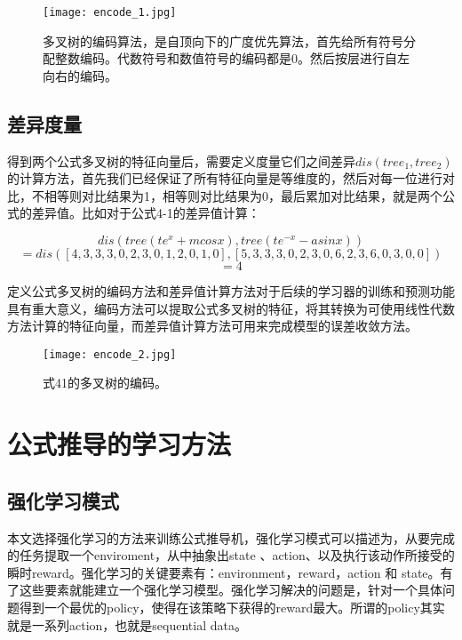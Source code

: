 \documentclass[runningheads]{llncs}
\begin{document}
\begin{figure}[H]
\centering
\texttt{[image: encode\_1.jpg]}
\caption{多叉树的编码算法，是自顶向下的广度优先算法，首先给所有符号分配整数编码。代数符号和数值符号的编码都是0。然后按层进行自左向右的编码。}
\end{figure}


\subsection{差异度量}
得到两个公式多叉树的特征向量后，需要定义度量它们之间差异$dis(tree_1,tree_2)$的计算方法，首先我们已经保证了所有特征向量是等维度的，然后对每一位进行对比，不相等则对比结果为1，相等则对比结果为0，最后累加对比结果，就是两个公式的差异值。比如对于公式4-1的差异值计算：

$$dis(tree(te^x+mcosx),tree(te^{-x}-asinx))$$
$$=dis([4,3,3,3,0,2,3,0,1,2,0,1,0],[5,3,3,3,0,2,3,0,6,2,3,6,0,3,0,0])$$
$$=4$$


定义公式多叉树的编码方法和差异值计算方法对于后续的学习器的训练和预测功能具有重大意义，编码方法可以提取公式多叉树的特征，将其转换为可使用线性代数方法计算的特征向量，而差异值计算方法可用来完成模型的误差收敛方法。

\begin{figure}[H]
\centering
\texttt{[image: encode\_2.jpg]}
\caption{式41的多叉树的编码。}
\end{figure}













\section{公式推导的学习方法}
\subsection{强化学习模式}
本文选择强化学习的方法来训练公式推导机，强化学习模式可以描述为，从要完成的任务提取一个enviroment，从中抽象出state 、action、以及执行该动作所接受的瞬时reward。强化学习的关键要素有：environment，reward，action 和 state。有了这些要素就能建立一个强化学习模型。强化学习解决的问题是，针对一个具体问题得到一个最优的policy，使得在该策略下获得的reward最大。所谓的policy其实就是一系列action，也就是sequential data。 
\end{document}
